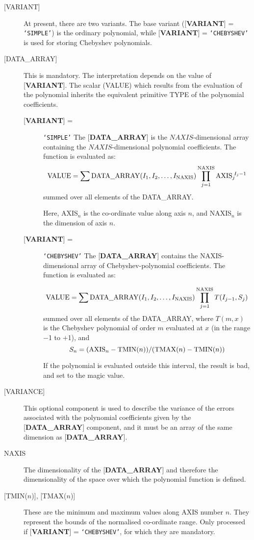 \documentclass[twoside,11pt]{article}
\begin{document}
\begin{description}
\item [{[}VARIANT{]}] At present, there are
two variants. The base variant
({[}{\bf VARIANT}{]} = {\tt `SIMPLE'}) is the ordinary polynomial,
while
{[}{\bf VARIANT}{]} = {\tt `CHEBYSHEV'} is used
for storing Chebyshev polynomials.
\item [{[}DATA\_ARRAY{]}]  This is mandatory.  The
interpretation depends on the value
of {[}{\bf VARIANT}{]}.  The
scalar (VALUE) which results from the
evaluation of the polynomial inherits the equivalent primitive TYPE
of the polynomial coefficients.

\begin{description}
\item [{[}{\bf VARIANT}{]} =] {\tt `SIMPLE'}
The {[}{\bf DATA\_ARRAY}{]} is the $NAXIS$-dimensional array containing
the $NAXIS$-di\-men\-sion\-al poly\-no\-mial
co\-efficients.  The function is evaluated as:
\[{\rm VALUE} = \sum {\rm DATA\underline{~~}ARRAY}(I_1,I_2,\ldots,I_{\rm NAXIS}) \prod_{j=1}^{\rm NAXIS} {\rm AXIS}_j\!^{I_j-1} \]
summed over all elements of the DATA\_ARRAY.

Here, AXIS$_n$ is the co-ordinate value along axis $n$, and
NAXIS$_n$ is the dimension of axis $n$.

\item [{[}{\bf VARIANT}{]} =] {\tt `CHEBYSHEV'}
The {[}{\bf DATA\_ARRAY}{]} contains the NAXIS-dimensional
array of Chebyshev-polynomial coefficients.  The function is evaluated as: 

\[{\rm VALUE}=\sum {\rm DATA\underline{~~}ARRAY}(I_1,I_2,\ldots,I_{\rm NAXIS})\prod_{j=1}^{\rm NAXIS} T(I_{j-1},S_j) \]
summed over all elements of the DATA\_ARRAY, where
$T(m,x)$ is the Chebyshev polynomial of order $m$ evaluated at
$x$ (in the range $-$1 to $+$1),
and
\[ S_n = ({\rm AXIS}_n - {\rm TMIN}(n))/({\rm TMAX}(n) - {\rm TMIN}(n)) \]

If the polynomial is evaluated outside this interval, the result is bad, and set
to the magic value.
\end{description}
\item [{[}VARIANCE{]}]
This optional component is used to describe the variance of the
errors associated with the polynomial coefficients given
by the {[}{\bf DATA\_ARRAY}{]} component, and
it must be an array of the same
dimension as {[}{\bf DATA\_ARRAY}{]}.
\item [NAXIS]
The dimensionality of the
{[}{\bf DATA\_ARRAY}{]} and therefore the dimensionality
of the space over which the polynomial function is defined.
\item [{[}TMIN{\rm ($n$)}{]}, {[}TMAX{\rm ($n$)}{]}]
These are the minimum and maximum values along
AXIS number $n$.  They represent the bounds of the normalised
co-ordinate range.  Only processed if
{[}{\bf VARIANT}{]} = {\tt `CHEBYSHEV'}, for which they are mandatory.
\end{description}
\end{document}
